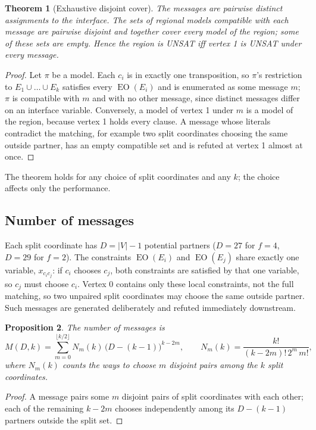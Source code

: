 \documentclass[11pt,a4paper]{article}
\newtheorem{theorem}{Theorem}
\newtheorem{proposition}[theorem]{Proposition}
\theoremstyle{definition}
\newcommand{\EO}{\operatorname{EO}}
\begin{document}
\begin{theorem}[Exhaustive disjoint cover]\label{thm:split}
The messages are pairwise distinct assignments to the interface. The sets of regional models
compatible with each message are pairwise disjoint and together cover every model of the
region; some of these sets are empty. Hence the region is UNSAT iff vertex 1 is UNSAT under
every message.
\end{theorem}
\begin{proof}
Let $\pi$ be a model. Each $c_i$ is in exactly one transposition, so $\pi$'s restriction to
$E_1\cup\dots\cup E_k$ satisfies every $\EO(E_i)$ and is enumerated as some message $m$;
$\pi$ is compatible with $m$ and with no other message, since distinct messages differ on an
interface variable. Conversely, a model of vertex 1 under $m$ is a model of the region,
because vertex 1 holds every clause. A message whose literals contradict the matching, for
example two split coordinates choosing the same outside partner, has an empty compatible set
and is refuted at vertex 1 almost at once.
\end{proof}

The theorem holds for any choice of split coordinates and any $k$; the choice affects only
the performance.

\subsection{Number of messages}

Each split coordinate has $D=|V|-1$ potential partners ($D=27$ for $f=4$, $D=29$ for $f=2$).
The constraints $\EO(E_i)$ and $\EO(E_j)$ share exactly one variable, $x_{c_ic_j}$: if $c_i$
chooses $c_j$, both constraints are satisfied by that one variable, so $c_j$ must choose
$c_i$. Vertex 0 contains only these local constraints, not the full matching, so two
unpaired split coordinates may choose the same outside partner. Such messages are generated
deliberately and refuted immediately downstream.

\begin{proposition}\label{prop:M}
The number of messages is
\[
M(D,k)=\sum_{m=0}^{\lfloor k/2\rfloor} N_m(k)\,\bigl(D-(k-1)\bigr)^{k-2m},\qquad
N_m(k)=\frac{k!}{(k-2m)!\,2^m\,m!},
\]
where $N_m(k)$ counts the ways to choose $m$ disjoint pairs among the $k$ split coordinates.
\end{proposition}
\begin{proof}
A message pairs some $m$ disjoint pairs of split coordinates with each other; each of the
remaining $k-2m$ chooses independently among its $D-(k-1)$ partners outside the split set.
\end{proof}
\end{document}
